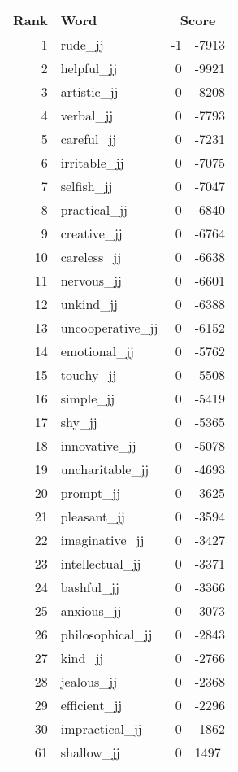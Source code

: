 \begin{longtable}[!htbp]{| rlr@{.}l |}
    \hline
    \textbf{Rank} & \textbf{Word} & \multicolumn{2}{c|}{\textbf{Score}} \\
    \hline
    \endhead
    1 & rude\_jj & -1 & -7913 \\
    2 & helpful\_jj & 0 & -9921 \\
    3 & artistic\_jj & 0 & -8208 \\
    4 & verbal\_jj & 0 & -7793 \\
    5 & careful\_jj & 0 & -7231 \\
    6 & irritable\_jj & 0 & -7075 \\
    7 & selfish\_jj & 0 & -7047 \\
    8 & practical\_jj & 0 & -6840 \\
    9 & creative\_jj & 0 & -6764 \\
    10 & careless\_jj & 0 & -6638 \\
    11 & nervous\_jj & 0 & -6601 \\
    12 & unkind\_jj & 0 & -6388 \\
    13 & uncooperative\_jj & 0 & -6152 \\
    14 & emotional\_jj & 0 & -5762 \\
    15 & touchy\_jj & 0 & -5508 \\
    16 & simple\_jj & 0 & -5419 \\
    17 & shy\_jj & 0 & -5365 \\
    18 & innovative\_jj & 0 & -5078 \\
    19 & uncharitable\_jj & 0 & -4693 \\
    20 & prompt\_jj & 0 & -3625 \\
    21 & pleasant\_jj & 0 & -3594 \\
    22 & imaginative\_jj & 0 & -3427 \\
    23 & intellectual\_jj & 0 & -3371 \\
    24 & bashful\_jj & 0 & -3366 \\
    25 & anxious\_jj & 0 & -3073 \\
    26 & philosophical\_jj & 0 & -2843 \\
    27 & kind\_jj & 0 & -2766 \\
    28 & jealous\_jj & 0 & -2368 \\
    29 & efficient\_jj & 0 & -2296 \\
    30 & impractical\_jj & 0 & -1862 \\
    61 & shallow\_jj & 0 & 1497 \\

\end{longtable}
